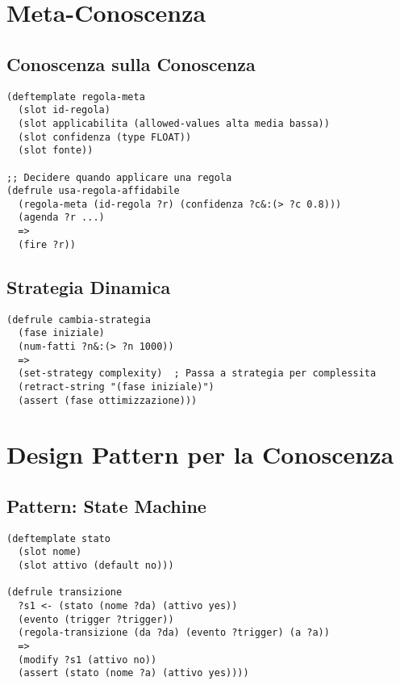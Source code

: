 \section{Meta-Conoscenza}

\subsection{Conoscenza sulla Conoscenza}

\begin{lstlisting}[language=CLIPS]
(deftemplate regola-meta
  (slot id-regola)
  (slot applicabilita (allowed-values alta media bassa))
  (slot confidenza (type FLOAT))
  (slot fonte))

;; Decidere quando applicare una regola
(defrule usa-regola-affidabile
  (regola-meta (id-regola ?r) (confidenza ?c&:(> ?c 0.8)))
  (agenda ?r ...)
  =>
  (fire ?r))
\end{lstlisting}

\subsection{Strategia Dinamica}

\begin{lstlisting}[language=CLIPS]
(defrule cambia-strategia
  (fase iniziale)
  (num-fatti ?n&:(> ?n 1000))
  =>
  (set-strategy complexity)  ; Passa a strategia per complessita
  (retract-string "(fase iniziale)")
  (assert (fase ottimizzazione)))
\end{lstlisting}

\section{Design Pattern per la Conoscenza}

\subsection{Pattern: State Machine}

\begin{lstlisting}[language=CLIPS]
(deftemplate stato
  (slot nome)
  (slot attivo (default no)))

(defrule transizione
  ?s1 <- (stato (nome ?da) (attivo yes))
  (evento (trigger ?trigger))
  (regola-transizione (da ?da) (evento ?trigger) (a ?a))
  =>
  (modify ?s1 (attivo no))
  (assert (stato (nome ?a) (attivo yes))))
\end{lstlisting}

